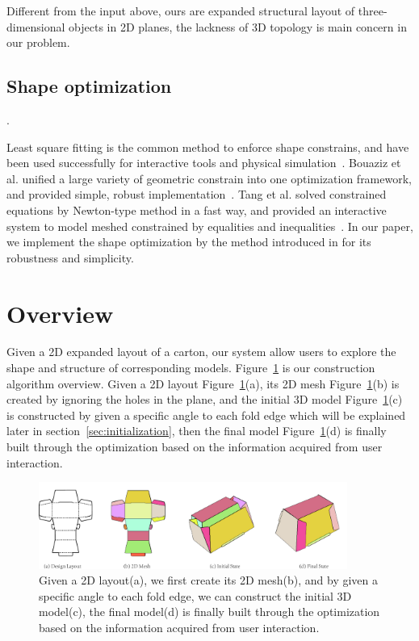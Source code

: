 \documentclass[submission]{gmp2018}
\begin{document}
Different from the input above, ours are expanded structural layout of three-dimensional objects in 2D planes, the lackness of 3D topology is main concern in our problem.

\subsection{Shape optimization}
{\color{red}{Add more?}}.

Least square fitting is the common method to enforce shape constrains, and have been used successfully for interactive tools and physical simulation~\cite{Botsch:2006:PCP:1281957.1281959,Igarashi:2005:ASM:1186822.1073323}. Bouaziz et al.  unified a large variety of geometric constrain into one optimization framework, and provided simple, robust implementation~\cite{Bouaziz:2012:SSD:2346796.2346802}. Tang et al. solved constrained equations by Newton-type method in a fast way, and provided an interactive system to model meshed constrained by equalities and inequalities~\cite{Tang:2014:FPM:2601097.2601213}. In our paper, we implement the shape optimization by the method introduced in \cite{Bouaziz:2012:SSD:2346796.2346802} for its robustness and simplicity.


\section{Overview}\label{sec:overview}
Given a 2D expanded layout of a carton, our system allow users to explore the shape and structure of corresponding models. Figure~\ref{fig:overview} is our construction algorithm overview. Given a 2D layout Figure~\ref{fig:overview}(a), its 2D mesh Figure~\ref{fig:overview}(b) is created by ignoring the holes in the plane, and the initial 3D model Figure~\ref{fig:overview}(c) is constructed by given a specific angle to each fold edge which will be explained later in section~\ref{sec:initialization}, then the final model Figure~\ref{fig:overview}(d) is finally built through the optimization based on the information acquired from user interaction. 

\begin{figure}
	\centering
	\includegraphics[width=0.9\textwidth]{images/overview.jpg}
	\caption{Given a 2D layout(a), we first create its 2D mesh(b), and by given a specific angle to each fold edge, we can construct the initial 3D model(c), the final model(d) is finally built through the optimization based on the information acquired from user interaction.}
	\label{fig:overview}
\end{figure} 
\end{document}
